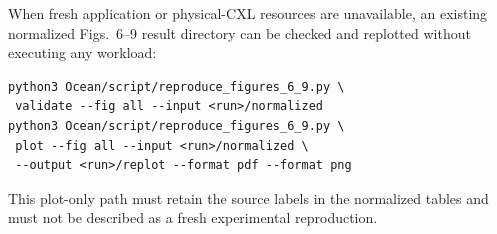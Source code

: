 \documentclass[conference]{IEEEtran}
\begin{document}
When fresh application or physical-CXL resources are unavailable, an existing
normalized Figs.~6--9 result directory can be checked and replotted without
executing any workload:
\begin{verbatim}
python3 Ocean/script/reproduce_figures_6_9.py \
 validate --fig all --input <run>/normalized
python3 Ocean/script/reproduce_figures_6_9.py \
 plot --fig all --input <run>/normalized \
 --output <run>/replot --format pdf --format png
\end{verbatim}
This plot-only path must retain the source labels in the normalized tables and
must not be described as a fresh experimental reproduction.
\end{document}
